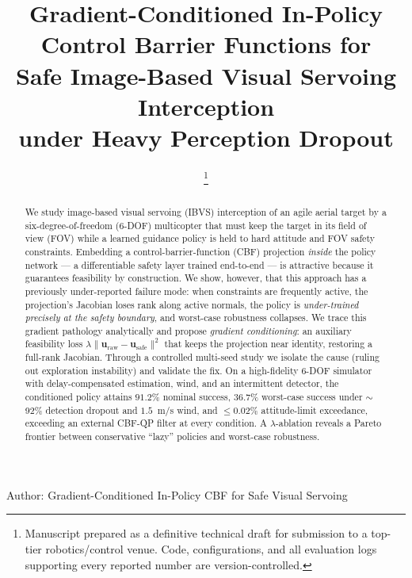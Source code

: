 \documentclass[journal]{IEEEtran}
\newcommand{\uraw}{\mathbf{u}_{\mathrm{raw}}}
\newcommand{\usafe}{\mathbf{u}_{\mathrm{safe}}}
\begin{document}
\title{Gradient-Conditioned In-Policy Control Barrier Functions for\\
Safe Image-Based Visual Servoing Interception\\
under Heavy Perception Dropout}

\author{%
\thanks{Manuscript prepared as a definitive technical draft for submission
to a top-tier robotics/control venue. Code, configurations, and all
evaluation logs supporting every reported number are version-controlled.}}

%
{Author: Gradient-Conditioned In-Policy CBF for Safe Visual Servoing}

\maketitle

\begin{abstract}
We study image-based visual servoing (IBVS) interception of an agile aerial
target by a six-degree-of-freedom (6-DOF) multicopter that must keep the
target in its field of view (FOV) while a learned guidance policy is held to
hard attitude and FOV safety constraints. Embedding a control-barrier-function
(CBF) projection \emph{inside} the policy network --- a differentiable safety
layer trained end-to-end --- is attractive because it guarantees feasibility
by construction. We show, however, that this approach has a previously
under-reported failure mode: when constraints are frequently active, the
projection's Jacobian loses rank along active normals, the policy is
\emph{under-trained precisely at the safety boundary}, and worst-case
robustness collapses. We trace this gradient pathology analytically and
propose \emph{gradient conditioning}: an auxiliary feasibility loss
$\lambda\lVert\uraw-\usafe\rVert^2$ that keeps the projection near identity,
restoring a full-rank Jacobian. Through a controlled multi-seed study we
isolate the cause (ruling out exploration instability) and validate the fix.
On a high-fidelity 6-DOF simulator with delay-compensated estimation, wind,
and an intermittent detector, the conditioned policy attains $91.2\%$ nominal
success, $36.7\%$ worst-case success under $\sim$92\% detection dropout and
$1.5$~m/s wind, and $\le 0.02\%$ attitude-limit exceedance, exceeding an
external CBF-QP filter at every condition. A $\lambda$-ablation reveals a
Pareto frontier between conservative ``lazy'' policies and worst-case
robustness.
\end{abstract}
\end{document}
